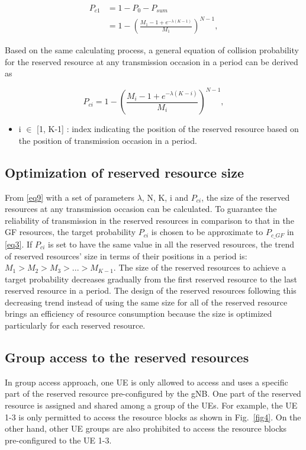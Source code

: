 \documentclass[conference]{IEEEtran}
\begin{document}
\begin{align}
P_{c1} &= 1 - P_{0} - P_{sum} \nonumber\\
 &= 1 - (\frac{M_{1}-1+e^{-\lambda(K-1)}}{M_{1}})^{N-1},\label{eq8}
\end{align}

Based on the same calculating process, a general equation of collision probability for the reserved resource at any transmission occasion in a period can be derived as

\begin{equation}
P_{ci} = 1 - (\frac{M_{i}-1+e^{-\lambda(K-i)}}{M_{i}})^{N-1},\label{eq9}
\end{equation}

\begin{itemize}
    \item i $\in$ [1, K-1] : index indicating the position of the reserved resource based on the position of transmission occasion in a period.
\end{itemize}

\subsection{Optimization of reserved resource size}\label{IIDD}
From \eqref{eq9} with a set of parameters  $\lambda$, N, K, i and $P_{ci}$, the size of the reserved resources at any transmission occasion can be calculated. To guarantee the reliability of transmission in the reserved resources in comparison to that in the GF resources, the target probability $P_{ci}$ is chosen to be approximate to $P_{c\_GF}$ in \eqref{eq3}. If $P_{ci}$ is set to have the same value in all the reserved resources, the trend of reserved resources' size in terms of their positions in a period is: $M_1 > M_2 > M_3 > ... > M_{K-1}$. The size of the reserved resources to achieve a target probability decreases gradually from the first reserved resource to the last reserved resource in a period. The design of the reserved resources following this decreasing trend instead of using the same size for all of the reserved resource brings an efficiency of resource consumption because the size is optimized particularly for each reserved resource.

\subsection{Group access to the reserved resources}\label{IIEE}
In group access approach, one UE is only allowed to access and uses a specific part of the reserved resource pre-configured by the gNB. One part of the reserved resource is assigned and shared among a group of the UEs. For example, the UE 1-3 is only permitted to access the resource blocks as shown in Fig.~\ref{fig4}. On the other hand, other UE groups are also prohibited to access the resource blocks pre-configured to the UE 1-3. 
\end{document}
